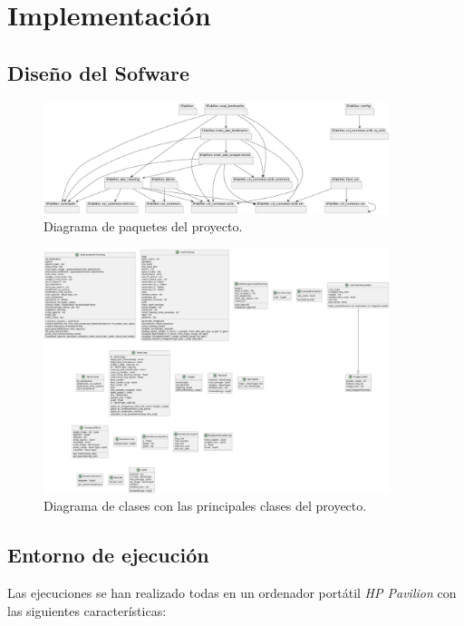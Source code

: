 \chapter{Implementación}

\section{Diseño del Sofware}

\begin{figure}[!h]
    \centering
    \includegraphics[width=0.9\textwidth]{img/diagrama_paquetes_1.png}
    \caption{Diagrama de paquetes del proyecto.}
    \label{fig:Diagrama_paquetes}
\end{figure}


\begin{figure}[!h]
    \centering
    \includegraphics[width=0.9\textwidth]{img/diagrama_clases.png}
    \caption{Diagrama de clases con las principales clases del proyecto.}
    \label{fig:Diagrama_clases}
\end{figure}

\section{Entorno de ejecución}
\noindent Las ejecuciones se han realizado todas en un ordenador portátil \textit{HP Pavilion} con las siguientes características: 

